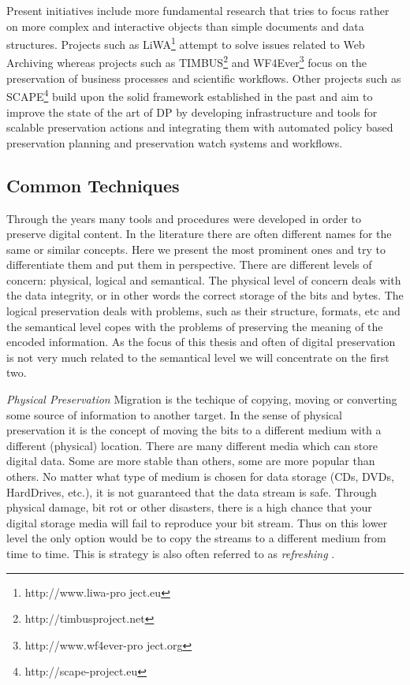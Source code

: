 Present initiatives include more fundamental research that tries to focus rather on more complex and interactive objects than simple documents and data structures. Projects such as LiWA\footnote{http://www.liwa-pro ject.eu} attempt to solve issues related to Web Archiving whereas projects such as TIMBUS\footnote{http://timbusproject.net} and WF4Ever\footnote{http://www.wf4ever-pro ject.org} focus on the preservation of business processes and scientific workflows.
Other projects such as SCAPE\footnote{http://scape-project.eu} build upon the solid framework established in the past and aim to improve the state of the art of DP by developing infrastructure and tools for scalable preservation actions and integrating them with automated policy based preservation planning and preservation watch systems and workflows.

\subsection{Common Techniques}
Through the years many tools and procedures were developed in order to preserve digital content. In the literature there are often different names for the same or similar concepts. Here we present the most prominent ones and try to differentiate them and put them in perspective. There are different levels of concern: physical, logical and semantical.
The physical level of concern deals with the data integrity, or in other words the correct storage of the bits and bytes. The logical preservation deals with problems, such as their structure, formats, etc and the semantical level copes with the problems of preserving the meaning of the encoded information. As the focus of this thesis and often of digital preservation is not very much related to the semantical level we will concentrate on the first two. \newline

\textit{Physical Preservation}
Migration is the techique of copying, moving or converting some source of information to another target. In the sense of physical preservation it is the concept of moving the bits to a different medium with a different (physical) location. There are many different media which can store digital data. Some are more stable than others, some are more popular than others. No matter what type of medium is chosen for data storage (CDs, DVDs, HardDrives, etc.), it is not guaranteed that the data stream is safe. Through physical damage, bit rot or other disasters, there is a high chance that your digital storage media will fail to reproduce your bit stream. Thus on this lower level the only option would be to copy the streams to a different medium from time to time. This is strategy is also often referred to as \textit{refreshing} \cite{Lee:2002:SOTADP}.

